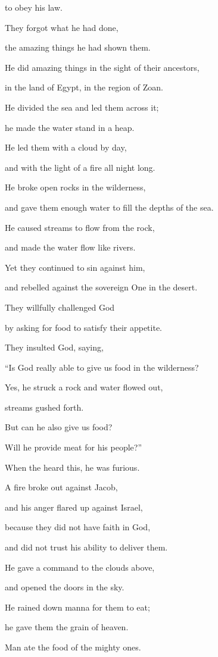 {to obey
his law.
\par }{\Q {}They forgot
what
he had done,
\par }{\Q the amazing
things he had
shown them.
\par }{\Q {}He did
amazing
things in the sight
of their ancestors,
\par }{\Q in the land
of Egypt,
in the region
of Zoan.
\par }{\Q {}He divided
the sea
and led them across
it;
\par }{\Q he made the water
stand
in a heap.
\par }{\Q {}He led
them with a cloud
by day,
\par }{\Q and with the light
of a fire
all
night long.
\par }{\Q {}He broke
open rocks
in the wilderness,
\par }{\Q and gave them enough
water
to fill the depths of the sea.
\par }{\Q {}He caused
streams
to flow from the rock,
\par }{\Q and made the water
flow
like rivers.
\par }{\Q {}Yet
they continued
to sin
against him,
\par }{\Q and rebelled
against the sovereign
One in the desert.
\par }{\Q {}They willfully
challenged
God
\par }{\Q by asking
for food
to satisfy their appetite.
\par }{\Q {}They insulted
God,
saying,
\par }{\Q “Is God
really able
to give
us food
in the wilderness?
\par }{\Q {}Yes,
he struck
a rock
and water
flowed out,
\par }{\Q streams
gushed forth.
\par }{\Q But can
he also
give
us food?
\par }{\Q Will he provide
meat
for his people?”
\par }{\Q {}When the
{}
heard
this,
he was furious.
\par }{\Q A fire
broke out against Jacob,
\par }{\Q and his anger
flared
up
against Israel,
\par }{\Q {}because
they did not
have faith
in God,
\par }{\Q and did not
trust
his ability to deliver them.
\par }{\Q {}He gave a command
to the clouds
above,
\par }{\Q and opened
the doors
in the sky.
\par }{\Q {}He rained
down manna
for them to eat;
\par }{\Q he gave
them the grain
of heaven.
\par }{\Q {}Man
ate
the food
of the mighty
ones.

}
